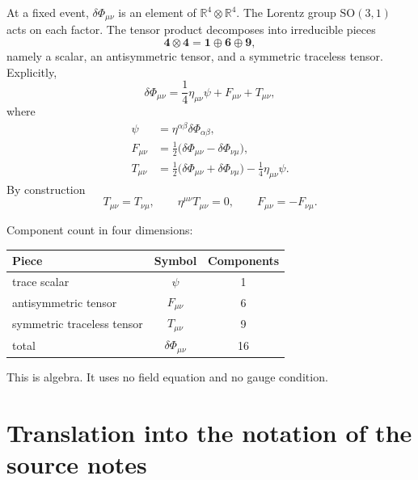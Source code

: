At a fixed event, \(\delta\Phi_{\mu\nu}\) is an element of
\(\mathbb{R}^4\otimes\mathbb{R}^4\). The Lorentz group
\(\mathrm{SO}(3,1)\) acts on each factor. The tensor product
decomposes into irreducible pieces
\begin{equation}
  \label{eq:tensor-product}
  \mathbf{4}\otimes\mathbf{4}
  =\mathbf{1}\oplus\mathbf{6}\oplus\mathbf{9},
\end{equation}
namely a scalar, an antisymmetric tensor, and a symmetric traceless
tensor. Explicitly,
\begin{equation}
  \label{eq:algebraic-split}
  \delta\Phi_{\mu\nu}
  =\frac14\eta_{\mu\nu}\psi
   +F_{\mu\nu}
   +T_{\mu\nu},
\end{equation}
where
\begin{equation}
  \label{eq:pieces-def}
  \begin{aligned}
    \psi
    &=\eta^{\alpha\beta}\delta\Phi_{\alpha\beta},\\
    F_{\mu\nu}
    &=\frac12\bigl(\delta\Phi_{\mu\nu}-\delta\Phi_{\nu\mu}\bigr),\\
    T_{\mu\nu}
    &=\frac12\bigl(\delta\Phi_{\mu\nu}+\delta\Phi_{\nu\mu}\bigr)
      -\frac14\eta_{\mu\nu}\psi.
  \end{aligned}
\end{equation}
By construction
\begin{equation}
  \label{eq:STF}
  T_{\mu\nu}=T_{\nu\mu},
  \qquad
  \eta^{\mu\nu}T_{\mu\nu}=0,
  \qquad
  F_{\mu\nu}=-F_{\nu\mu}.
\end{equation}

Component count in four dimensions:
\begin{center}
\begin{tabular}{@{}lcc@{}}
\toprule
Piece & Symbol & Components \\
\midrule
trace scalar & \(\psi\) & 1 \\
antisymmetric tensor & \(F_{\mu\nu}\) & 6 \\
symmetric traceless tensor & \(T_{\mu\nu}\) & 9 \\
total & \(\delta\Phi_{\mu\nu}\) & 16 \\
\bottomrule
\end{tabular}
\end{center}
This is algebra. It uses no field equation and no gauge condition.

\section{Translation into the notation of the source notes}
\label{sec:ch5-dictionary}

